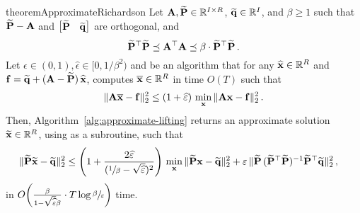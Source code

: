 \begin{restatable}{theorem}{ApproximateRichardson}
\label{thm:approximate-richardson}
Let $\mat{A},\widetilde{\mat{P}} \in \R^{I \times R}$, $\widetilde{\mat{q}}\in\R^{I}$, and $\beta \ge 1$
such that
$\widetilde{\mat{P}}-\mat{A}$ and $\bigl[\begin{matrix} \widetilde{\mat{P}} & \widetilde{\mat{q}} \end{matrix}\bigr]$ are orthogonal, and
\[
    \widetilde{\mat{P}}^\top \widetilde{\mat{P}}
    \preceq
    \mat{A}^\top \mat{A}
    \preceq
    \beta \cdot \widetilde{\mat{P}}^\top \widetilde{\mat{P}}\,.
\]
Let $\epsilon \in (0,1), \widehat{\epsilon} \in [0,1/\beta^2)$ and
\ApproximateSolve be an algorithm that for any
$\widehat{\mat{x}}\in\R^{R}$ and $\mat{f}=\widetilde{\mat{q}}+(\mat{A}-\widetilde{\mat{P}})\, \widehat{\mat{x}}$,
computes $\overline{\mat{x}} \in \R^{R}$ in time $O(T)$ such that
\[
\norm{\mat{A}\overline{\mat{x}}-\mat{f}}_2^2\leq (1+\widehat{\epsilon})\,\min_{\mat{x}}\, \norm{\mat{A}\mat{x}-\mat{f}}_2^2\,.
\]
Then, Algorithm~\ref{alg:approximate-lifting} returns an approximate solution
$\widetilde{\mat{x}} \in \R^{R}$, using  \ApproximateSolve as a subroutine, such that
\begin{align*}
    \norm{\widetilde{\mat{P}} \widetilde{\mat{x}}-\widetilde{\mat{q}}}_2^2
    &\leq
    \parens*{1 + \frac{2 \widehat{\epsilon}}{(\sfrac{1}{\beta} - \sqrt{\widehat{\epsilon}})^2}}\, \min_{\mat{x}}\, \norm{\widetilde{\mat{P}} \mat{x}-\widetilde{\mat{q}}}_2^2 
    + \epsilon\, \norm{\widetilde{\mat{P}}\,(\widetilde{\mat{P}}^\top \widetilde{\mat{P}})^{-1} \widetilde{\mat{P}}^\top \widetilde{\mat{q}}}_2^2\,,
\end{align*}
in $O\parens*{\frac{\beta}{1-\sqrt{\widehat{\epsilon}} \beta} \cdot  T \log \sfrac{\beta}\epsilon}$ time.
\end{restatable}

